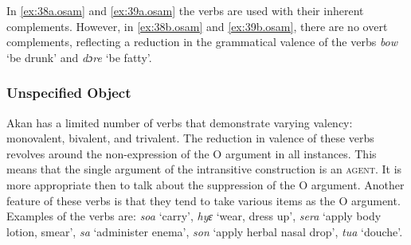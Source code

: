 \documentclass[output=paper]{langsci/langscibook}
\begin{document}
	\z
\z


\ea
\label{ex:39.osam}
	\z

	\z
\z


In \ref{ex:38a.osam} and \ref{ex:39a.osam} the verbs are used with their inherent complements. However, in \ref{ex:38b.osam} and \ref{ex:39b.osam}, there are no overt complements, reflecting a reduction in the grammatical valence of the verbs \textit{bow} `be drunk' and \textit{dɔre} `be fatty'.

\subsubsection{Unspecified Object}\label{§4.5.2:unspecified.osam}

Akan has a limited number of verbs that demonstrate varying valency: monovalent, bivalent, and trivalent. The reduction in valence of these verbs revolves around the non-expression of the O argument in all instances. This means that the single argument of the intransitive construction is an \textsc{agent}. It is more appropriate then to talk about the suppression of the O argument. Another feature of these verbs is that they tend to take various items as the O argument. Examples of the verbs are: \textit{soa} `carry', \textit{hyɛ} `wear, dress up', \textit{sera} `apply body lotion, smear', \textit{sa} `administer enema', \textit{son} `apply herbal nasal drop', \textit{tua} `douche'.


\ea
\label{ex:40.osam}
	\z

	\z
\z
\end{document}
